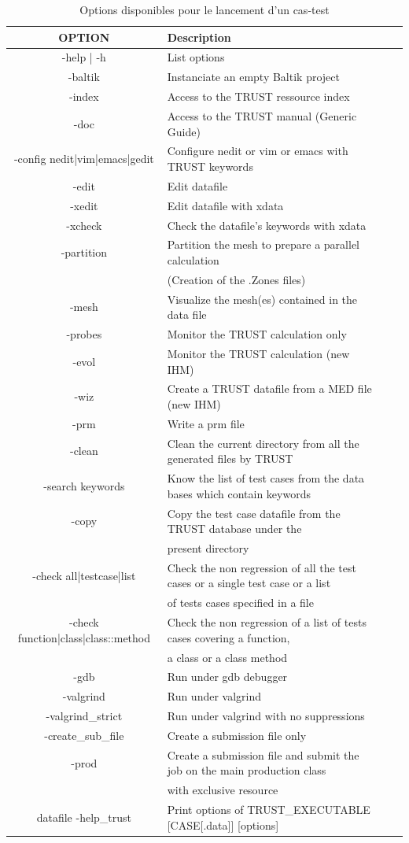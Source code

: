 \begin{table}[H]
\begin{centering}
\small
\begin{tabular}{Sl Sl}
\hline\hline
{}\textbf{OPTION} & \textbf{Description} \tabularnewline
\hline
-help | -h & List options \tabularnewline \hline
-baltik & Instanciate an empty Baltik project \tabularnewline \hline
-index & Access to the TRUST ressource index \tabularnewline \hline
-doc & Access to the TRUST manual (Generic Guide) \tabularnewline \hline
-config nedit|vim|emacs|gedit & Configure nedit or vim or emacs with TRUST keywords \tabularnewline \hline
-edit & Edit datafile \tabularnewline \hline
-xedit & Edit datafile with xdata \tabularnewline \hline
-xcheck & Check the datafile’s keywords with xdata \tabularnewline \hline
-partition & Partition the mesh to prepare a parallel calculation \tabularnewline
&(Creation of the .Zones files) \tabularnewline \hline
-mesh & Visualize the mesh(es) contained in the data file \tabularnewline \hline
-probes & Monitor the TRUST calculation only  \tabularnewline \hline
-evol & Monitor the TRUST calculation (new IHM) \tabularnewline \hline
-wiz & Create a TRUST datafile from a MED file (new IHM) \tabularnewline \hline
-prm & Write a prm file \tabularnewline \hline
-clean & Clean the current directory from all the generated
files by TRUST \tabularnewline \hline
-search keywords & Know the list of test cases from the data bases which contain keywords \tabularnewline \hline
-copy & Copy the test case datafile from the TRUST database
under the \tabularnewline
& present directory \tabularnewline \hline
-check all|testcase|list & Check the non regression of all the test cases or a single test case or a list \tabularnewline
& of tests cases specified in a file \tabularnewline \hline
-check function|class|class::method & Check the non regression of a list of tests cases covering a function, \tabularnewline
& a class or a class method\tabularnewline \hline
-gdb & Run under gdb debugger \tabularnewline \hline
-valgrind & Run under valgrind \tabularnewline \hline
-valgrind\_strict & Run under valgrind with no suppressions \tabularnewline \hline
-create\_sub\_file & Create a submission file only \tabularnewline \hline
-prod & Create a submission file and submit the job on the
main production class \tabularnewline 
& with exclusive resource \tabularnewline \hline
datafile -help\_trust & Print options of TRUST\_EXECUTABLE [CASE[.data]] [options] \tabularnewline \hline
\hline
\end{tabular}
\normalsize
\par\end{centering}
\caption{\label{tab:option-cas}Options disponibles pour le lancement d'un cas-test}
\end{table}